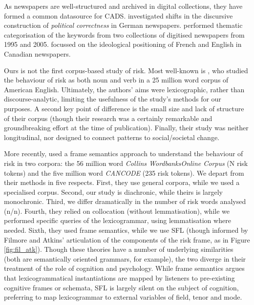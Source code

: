 		\noindent As newspapers are well-structured and archived in digital collections, they have formed a common datasource for CADS.  investigated shifts in the discursive construction of \emph{political correctness} in German newspapers.  performed thematic categorisation of the keywords from two collections of digitised newspapers from 1995 and 2005.  focussed on the ideological positioning of French and English in Canadian newspapers. %

		Ours is not the first corpus-based study of risk. Most well-known is , who studied the behaviour of risk as both noun and verb in a 25 million word corpus of American English. Ultimately, the authors' aims were lexicographic, rather than discourse-analytic, limiting the usefulness of the study's methods for our purposes. A second key point of difference is the small size and lack of structure of their corpus (though their research was a certainly remarkable and groundbreaking effort at the time of publication). Finally, their study was neither longitudinal, nor designed to connect patterns to social/societal change.

		More recently,  used a frame semantics approach to understand the behaviour of risk in two corpora: the 56 million word \emph{Collins WordbanksOnline Corpus} (N risk tokens) and the five million word \emph{CANCODE} (235 risk tokens). 
		We depart from their methods in five respects. First, they use general corpora, while we used a specialised corpus. Second, our study is diachronic, while theirs is largely monochronic. Third, we differ dramatically in the number of risk words analysed (n/n). Fourth, they relied on collocation (without lemmatisation), while we performed specific queries of the lexicogrammar, using lemmatisation where needed. Sixth, they used frame semantics, while we use SFL (though informed by Filmore and Atkins' \citeyear{fillmore_toward_1992} articulation of the components of the risk frame, as in Figure \ref{fig:fil_atk}). Though these theories have a number of underlying similarities (both are semantically oriented grammars, for example), the two diverge in their treatment of the role of cognition and psychology. While frame semantics argues that lexicogrammatical instantiations are mapped by listeners to pre-existing cognitive frames or schemata, SFL is largely silent on the subject of cognition, preferring to map lexicogrammar to external variables of field, tenor and mode.


